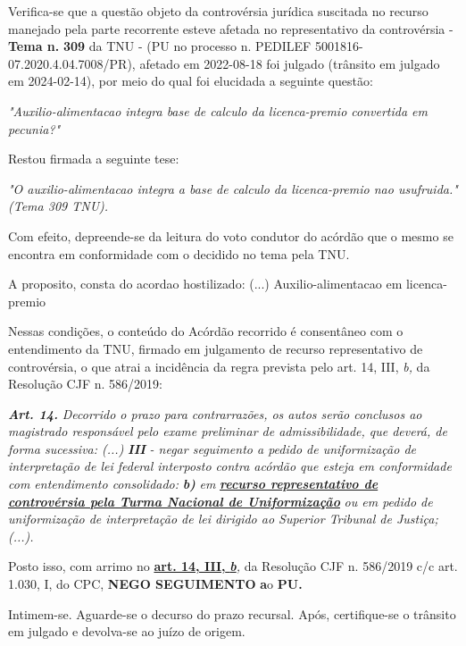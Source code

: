 \documentclass[12pt]{article}
\begin{document}
\justifying
\noindent Verifica-se que a questão objeto da controvérsia jurídica suscitada no recurso manejado pela parte recorrente esteve afetada no representativo da controvérsia - \textbf{Tema n. }\textbf{309} da TNU - (PU no processo n. PEDILEF 5001816-07.2020.4.04.7008/PR),  afetado em 2022-08-18 foi julgado (trânsito em julgado em 2024-02-14), por meio do qual foi elucidada a seguinte questão:

\noindent \textit{"Auxilio-alimentacao integra base de calculo da licenca-premio convertida em pecunia?"}

\noindent Restou firmada a seguinte tese:

\noindent \textit{"O auxilio-alimentacao integra a base de calculo da licenca-premio nao usufruida." (Tema 309 TNU).}

\noindent Com efeito, depreende-se da leitura do voto condutor do acórdão que o mesmo se encontra em conformidade com o decidido no  tema pela TNU.

\noindent A proposito, consta do acordao hostilizado: (...) Auxilio-alimentacao em licenca-premio

\noindent Nessas condições, o conteúdo do Acórdão recorrido é consentâneo com o entendimento da TNU, firmado em julgamento de recurso representativo de controvérsia, o que atrai a incidência da regra prevista pelo art. 14, III, \textit{b,} da Resolução CJF n. 586/2019:

\noindent \textit{\textbf{Art. 14.}}\textit{ Decorrido o prazo para contrarrazões, os autos serão conclusos ao magistrado responsável pelo exame preliminar de admissibilidade, que deverá, de forma sucessiva: (...) }\textit{\textbf{III }}\textit{- negar seguimento a pedido de uniformização de interpretação de lei federal interposto contra acórdão que esteja em conformidade com entendimento consolidado: }\textit{\textbf{b)}}\textit{ em }\uline{\textit{\textbf{recurso representativo de controvérsia pela Turma Nacional de Uniformização}}}\textit{ ou em pedido de uniformização de interpretação de lei dirigido ao Superior Tribunal de Justiça;(...).}

\noindent Posto isso, com arrimo no \uline{\textbf{art. 14, III, }}\uline{\textit{\textbf{b}}}\textit{,} da Resolução CJF n. 586/2019 c/c art. 1.030, I, do CPC, \textbf{NEGO SEGUIMENTO }\textbf{a}o\textbf{ PU}\textbf{.}

\noindent Intimem-se. Aguarde-se o decurso do prazo recursal. Após, certifique-se o trânsito em julgado e devolva-se ao juízo de origem.
\end{document}
